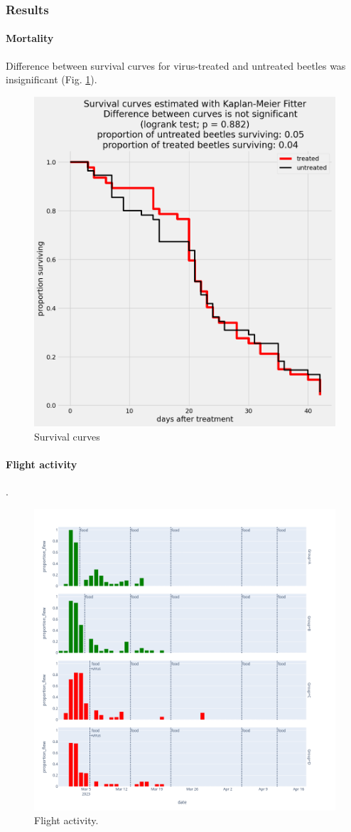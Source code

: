\documentclass[12pt,letterpaper,english,bibliography=totocnumbered, abstract=on]{scrartcl}
\begin{document}
\clearpage
\subsubsection{Results}

\paragraph{Mortality}

Difference between survival curves for virus-treated and untreated beetles was insignificant (Fig. \ref{fig:flight_test_survival_curves}).

\begin{figure}[H]
	\centering
	\includegraphics[width=0.7\linewidth]{images/flight_test/survival_curves}
	\caption{Survival curves}
	\label{fig:flight_test_survival_curves}
\end{figure}

\clearpage
\paragraph{Flight activity}.

\begin{figure}[H]
	\centering
	\includegraphics[width=0.7\linewidth]{images/flight_test/flight_activity}
	\caption{Flight activity.}
	\label{fig:flightactivity}
\end{figure}
\end{document}
